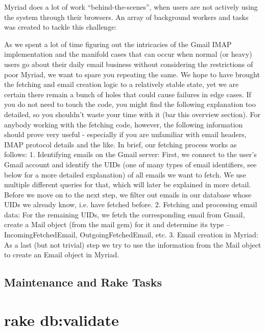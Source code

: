 Myriad does a lot of work ``behind-the-scenes'', when users are not actively using the system through their browsers. An array of background workers and tasks was created to tackle this challenge:


As we spent a lot of time figuring out the intricacies of the Gmail IMAP implementation and the manifold cases that can occur when normal (or heavy) users go about their daily email business without considering the restrictions of poor Myriad, we want to spare you repeating the same. We hope to have brought the fetching and email creation logic to a relatively stable state, yet we are certain there remain a bunch of holes that could cause failures in edge cases.
If you do not need to touch the code, you might find the following explanation too detailed, so you shouldn't waste your time with it (bar this overview section). For anybody working with the fetching code, however, the following information should prove very useful - especially if you are unfamiliar with email headers, IMAP protocol details and the like.
In brief, our fetching process works as follows:
1.	Identifying emails on the Gmail server: First, we connect to the user's Gmail account and identify the UIDs (one of many types of email identifiers, see below for a more detailed explanation) of all emails we want to fetch. We use multiple different queries for that, which will later be explained in more detail. Before we move on to the next step, we filter out emails in our database whose UIDs we already know, i.e. have fetched before.
2.	Fetching and processing email data: For the remaining UIDs, we fetch the corresponding email from Gmail, create a Mail object (from the mail gem) for it and determine its type – IncomingFetchedEmail, OutgoingFetchedEmail, etc.
3.	Email creation in Myriad: As a last (but not trivial) step we try to use the information from the Mail object to create an Email object in Myriad.


\subsection{Maintenance and Rake Tasks}

\section{rake db:validate}

